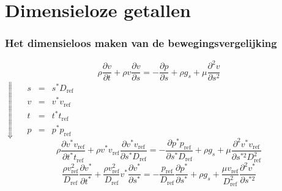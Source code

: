 \documentclass[t]{beamer}
\begin{document}
	\section{Dimensieloze getallen}	
  	\begin{frame}
		\frametitle{Het dimensieloos maken van de bewegingsvergelijking}
		\begin{equation*}
			\rho \frac{\partial v}{\partial t} + \rho v \frac{\partial v}{\partial s} = -\frac{\partial p}{\partial s} + \rho g_s + \mu \frac{\partial^2 v}{\partial s^2}
		\end{equation*}
		\pause
		\hspace{5cm} $\Downarrow \quad  \begin{array}{lcl}	s &=& s^* D_{\text{ref}} \\ v &=& v^* v_{\text{ref}}  \\ t &=& t^* t_{\text{ref}} \\ p &=& p^* p_{\text{ref}} \end{array} $ 
		\begin{equation*}
			\rho \frac{\partial v^* v_{\text{ref}}}{\partial t^* t_{\text{ref}}} + \rho v^* v_{\text{ref}} \frac{\partial v^* v_{\text{ref}}}{\partial s^* D_{\text{ref}}} = -\frac{\partial p^* p_{\text{ref}}}{\partial s^*D_{\text{ref}}} + \rho g_s + \mu \frac{\partial^2 v^* v_{\text{ref}}}{\partial s^{*2} D_{\text{ref}}^2}
		\end{equation*}
		\pause
		\vspace{0.5cm}
		\begin{equation*}
			\frac{\rho v_{\text{ref}}^2}{D_{\text{ref}}} \frac{\partial v^*}{\partial t^*} + \frac{\rho v_{\text{ref}}^2}{D_{\text{ref}}}v^* \frac{\partial v^*}{\partial s^*} = -\frac{p_{\text{ref}}}{D_{\text{ref}}} \frac{\partial p^*}{\partial s^*} + \rho g_s + \frac{\mu v_{\text{ref}}}{D_{\text{ref}}^2} \frac{\partial^2 v^*}{\partial s^{*2}}
		\end{equation*}
	\end{frame}
\end{document}
